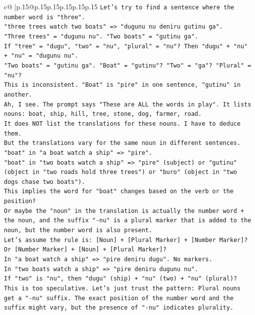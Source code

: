 \documentclass{article}
\begin{document}
{\begin{supertabular}{c@{$\;$}|p{.15\linewidth}@{}p{.15\linewidth}p{.15\linewidth}p{.15\linewidth}p{.15\linewidth}p{.15\linewidth}}
{{{\texttt{Let's try to find a sentence where the number word is "three".} \\
\texttt{"three trees watch two boats" => "dugunu nu deniru gutinu ga".} \\
\texttt{"Three trees" = "dugunu nu". "Two boats" = "gutinu ga".} \\
\texttt{If "tree" = "dugu", "two" = "nu", "plural" = "nu"? Then "dugu" + "nu" + "nu" = "dugunu nu".} \\
\texttt{"Two boats" = "gutinu ga". "Boat" = "gutinu"? "Two" = "ga"? "Plural" = "nu"?} \\
\texttt{This is inconsistent. "Boat" is "pire" in one sentence, "gutinu" in another.} \\
\texttt{Ah, I see. The prompt says "These are ALL the words in play". It lists nouns: boat, ship, hill, tree, stone, dog, farmer, road.} \\
\texttt{It does NOT list the translations for these nouns. I have to deduce them.} \\
\texttt{But the translations vary for the same noun in different sentences.} \\
\texttt{"boat" in "a boat watch a ship" => "pire".} \\
\texttt{"boat" in "two boats watch a ship" => "pire" (subject) or "gutinu" (object in "two roads hold three trees") or "buro" (object in "two dogs chase two boats").} \\
\texttt{This implies the word for "boat" changes based on the verb or the position?} \\
\texttt{Or maybe the "noun" in the translation is actually the number word + the noun, and the suffix "{-}nu" is a plural marker that is added to the noun, but the number word is also present.} \\
\texttt{Let's assume the rule is: {[}Noun{]} + {[}Plural Marker{]} + {[}Number Marker{]}? Or {[}Number Marker{]} + {[}Noun{]} + {[}Plural Marker{]}?} \\
\texttt{In "a boat watch a ship" => "pire deniru dugu". No markers.} \\
\texttt{In "two boats watch a ship" => "pire deniru dugunu nu".} \\
\texttt{If "two" is "nu", then "dugu" (ship) + "nu" (two) + "nu" (plural)?} \\
\texttt{This is too speculative. Let's just trust the pattern: Plural nouns get a "{-}nu" suffix. The exact position of the number word and the suffix might vary, but the presence of "{-}nu" indicates plurality.} \\
}}}
\end{supertabular}}
\end{document}

